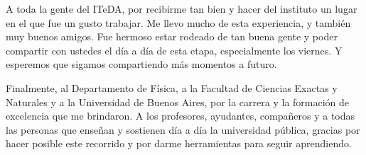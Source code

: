 \documentclass[spanish,a4paper,12pt]{book}
\begin{document}
	A toda la gente del ITeDA, por recibirme tan bien y hacer del instituto un lugar en el que fue un gusto trabajar. Me llevo mucho de esta experiencia, y también muy buenos amigos. Fue hermoso estar rodeado de tan buena gente y poder compartir con ustedes el día a día de esta etapa, especialmente los viernes. Y esperemos que sigamos compartiendo más momentos a futuro.
	
	Finalmente, al Departamento de Física, a la Facultad de	Ciencias Exactas y Naturales y a la Universidad de Buenos Aires, por la carrera y la formación de excelencia que me brindaron. A los profesores, ayudantes, compañeros y a todas las personas que enseñan y sostienen día a día la universidad pública,	gracias por hacer posible este recorrido y por darme herramientas para seguir aprendiendo.
	
	\clearpage
	\endgroup
	
	\newpage
	\setcounter{page}{1} 
	\tableofcontents
	\newpage
	
	
	
	
	
	
	
	
	
	\newpage
	\begin{appendices}
		\renewcommand{\appendixname}{Anexo}
		
		
	\end{appendices}
	
	\newpage
	\printbibliography[heading=bibintoc, title={Referencias}]
	
\end{document}
